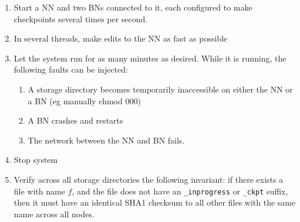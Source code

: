 \documentclass{article}
\begin{document}
\begin{enumerate}
\item Start a NN and two BNs connected to it, each configured to make checkpoints several times per second.
\item In several threads, make edits to the NN as fast as possible
\item Let the system run for as many minutes as desired. While it is running, the following faults can be injected:
  \begin{enumerate}
  \item A storage directory becomes temporarily inaccessible on either the NN or a BN (eg manually chmod 000)
  \item A BN crashes and restarts
  \item The network between the NN and BN fails.
  \end{enumerate}
\item Stop system
\item Verify across all storage directories the following invariant: if there exists a file with name $f$, and the file does not have an {\tt \_inprogress} or {\tt \_ckpt} suffix, then it must have an identical SHA1 checksum to all other files with the same name across all nodes.
\end{enumerate}
\end{document}
